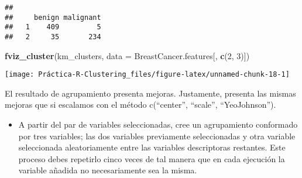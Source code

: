 \documentclass[
]{article}
\newenvironment{Shaded}{\begin{snugshade}}{\end{snugshade}}
\newcommand{\CommentTok}[1]{\textcolor[rgb]{0.56,0.35,0.01}{\textit{#1}}}
\newcommand{\DataTypeTok}[1]{\textcolor[rgb]{0.13,0.29,0.53}{#1}}
\newcommand{\DecValTok}[1]{\textcolor[rgb]{0.00,0.00,0.81}{#1}}
\newcommand{\KeywordTok}[1]{\textcolor[rgb]{0.13,0.29,0.53}{\textbf{#1}}}
\newcommand{\NormalTok}[1]{#1}
\newcommand{\OperatorTok}[1]{\textcolor[rgb]{0.81,0.36,0.00}{\textbf{#1}}}
\newcommand{\StringTok}[1]{\textcolor[rgb]{0.31,0.60,0.02}{#1}}
\providecommand{\tightlist}{%
  \setlength{\itemsep}{0pt}\setlength{\parskip}{0pt}}
\begin{document}
\begin{Shaded}
\end{Shaded}

\begin{verbatim}
##    
##     benign malignant
##   1    409         5
##   2     35       234
\end{verbatim}

\begin{Shaded}
\begin{Highlighting}[]
\KeywordTok{fviz_cluster}\NormalTok{(km_clusters, }\DataTypeTok{data =}\NormalTok{ BreastCancer.features[, }\KeywordTok{c}\NormalTok{(}\DecValTok{2}\NormalTok{, }\DecValTok{3}\NormalTok{)])}
\end{Highlighting}
\end{Shaded}

\begin{center}\texttt{[image: Práctica-R-Clustering\_files/figure-latex/unnamed-chunk-18-1]} \end{center}

El resultado de agrupamiento presenta mejoras. Justamente, presenta las
mismas mejoras que si escalamos con el método c(``center'', ``scale'',
``YeoJohnson'').

\begin{itemize}
\tightlist
\item
  A partir del par de variables seleccionadas, cree un agrupamiento
  conformado por tres variables; las dos variables previamente
  seleccionadas y otra variable seleccionada aleatoriamente entre las
  variables descriptoras restantes. Este proceso debes repetirlo cinco
  veces de tal manera que en cada ejecución la variable añadida no
  necesariamente sea la misma.
\end{itemize}
\end{document}
